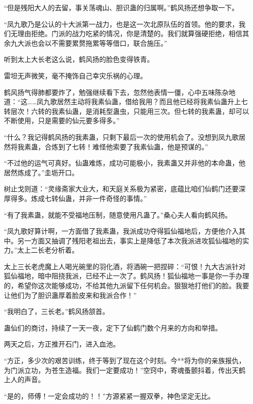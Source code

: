 
\begin{this_body}

“但是残阳大人的去留，事关荡魂山、胆识蛊的归属啊。”鹤风扬还想争取一下。

“凤九歌乃是公认的十大派第一战力，也是这一次北原队伍的首领。他的要求，我们无理由拒绝。门派的战力吃紧的情况，你是清楚的。我们就算强硬拒绝，相信其余九大派也会以不需要累赘拖累等等借口，联合施压。”

听到太上大长老这么说，鹤风扬的脸色变得铁青。

雷坦无声微笑，毫不掩饰自己幸灾乐祸的心理。

鹤风扬气得肺都要炸了，勉强继续看下去，忽然他表情一僵，心中五味陈杂地道：“这……凤九歌居然主动将我素仙蛊，借给我用？而且他已经将我素仙蛊升上七转层次！六转的我素仙蛊，是消耗型蛊虫，只能用三次。但七转的我素蛊，却可以不断使用，只是需要的仙元要多得多。”

“什么？我记得鹤风扬的我素蛊，只剩下最后一次的使用机会了。没想到凤九歌居然将我素蛊，合炼到了七转！难怪他索要了我素仙蛊，他是预谋的。”

“不过他的运气可真好。仙蛊难炼，成功可能极小，我素蛊又并非他的本命蛊，他居然炼成了。”圭坜开口。

树止戈则道：“灵缘斋家大业大，和天庭关系极为紧密，底蕴比咱们仙鹤门还要深厚得多。炼成七转仙蛊，并非一件奇怪的事情。”

“有了我素蛊，就能不受福地压制，随意使用凡蛊了。”桑心夫人看向鹤风扬。

“凤九歌好算计啊，一方面借了我素蛊，我派成功夺得狐仙福地后，方便他介入其中。另一方面又抽调了残阳老祖出去，事实上是降低了本次我派进攻狐仙福地的实力。”太上二长老分析着。

太上三长老虎魔上人喝光碗里的羽化酒，将酒碗一把捏碎：“可恨！九大古派针对狐仙福地，暗中阻挠我派，已经不止一次了。鹤风扬！狐仙福地一事是你一手办理的，希望你这次能够成功，不给其他九派留下任何机会。狠狠地打他们的脸。我要让他们为了胆识蛊厚着脸皮来和我派合作！”

“我明白了，三长老。”鹤风扬颔首。

蛊仙们的商讨，持续了一天一夜，定下了仙鹤门数个月来的方向和举措。

两天之后，方正推开石门，进入血池。

“方正，多少次的艰苦训练，终于等到了现在这个时刻。今**将为你的亲族报仇，为门派立功，为苍生造福。我们一定要成功！”空窍中，寄魂蚤颤抖着，传出天鹤上人的声音。

“是的，师傅！一定会成功的！！”方源紧紧一握双拳，神色坚定无比。


\end{this_body}
